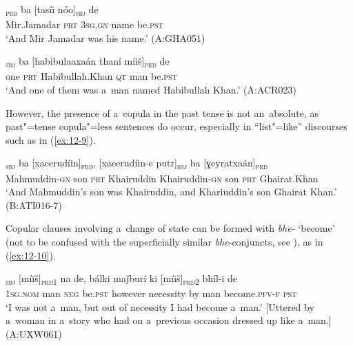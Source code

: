 \begin{exe}
\ex
\label{ex:12-7}
\gll [miirǰamadaár]\textsubscript{\textsc{prd}} ba [tasíi nóo]\textsubscript{\textsc{sbj}} de \\
Mir.Jamadar \textsc{prt} \textsc{3sg.gn} name be.\textsc{pst} \\
\glt `And Mir Jamadar was his name.' (A:GHA051)
\end{exe}
\begin{exe}
\ex
\label{ex:12-8}
\gll [áak]\textsubscript{\textsc{sbj}} ba [habibulaaxaán thaní míiš]\textsubscript{\textsc{prd}} de \\
one \textsc{prt} Habibullah.Khan \textsc{qt} man be.\textsc{pst} \\
\glt `And one of them was a~man named Habibullah Khan.' (A:ACR023)
\end{exe}

However, the presence of a~copula in the past tense is not an~absolute, as past"=tense copula"=less sentences do occur, especially in ``list"=like'' discourses such as in (\ref{ex:12-9}).

\begin{exe}
\ex
\label{ex:12-9}
\textsubscript{\textsc{sbj}} ba [xaeerudíin]\textsubscript{\textsc{prd}}, \textsc{[}xaeerudíin-e putr]\textsubscript{\textsc{sbj}} ba [ɣeyratxaán]\textsubscript{\textsc{prd}} \\
Mahmuddin-\textsc{gn} son \textsc{prt} Khairuddin Khairuddin-\textsc{gn} son \textsc{prt} Ghairat.Khan \\
\glt `And Mahmuddin's son was Khairuddin, and Khariuddin's son Ghairat Khan.' (B:ATI016-7)
\end{exe}

Copular clauses involving a~change of state can be formed with \textit{bhe-} `become' (not to be confused with the superficially similar \textit{bhe}-conjuncts, see ), as in (\ref{ex:12-10}).

\begin{exe}
\ex
\label{ex:12-10}
\gll [ma]\textsubscript{\textsc{sbj}} [míiš]\textsubscript{\textsc{prd1}} na de, bálki maǰburí ki [míiš]\textsubscript{\textsc{prd2}} bhíl-i de \\
\textsc{1sg.nom} man \textsc{neg} be.\textsc{pst}  however necessity by man become.\textsc{pfv-f} \textsc{pst} \\
\glt `I was not a~man, but out of necessity I had become a~man.' [Uttered by a~woman in a~story who had on a~previous occasion dressed up like a~man.] (A:UXW061)
\end{exe}

